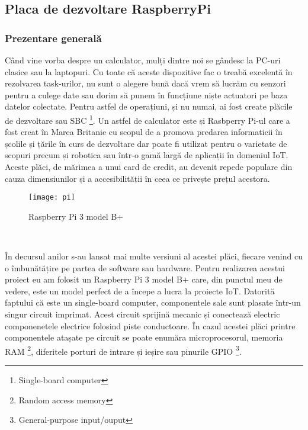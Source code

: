 \documentclass[../IoMusT.tex]{subfiles}
\begin{document}
\subsection{Placa de dezvoltare RaspberryPi}
\subsubsection{Prezentare generală}
Când vine vorba despre un calculator, mulți dintre noi se gândesc la PC-uri clasice sau la laptopuri. Cu toate că aceste dispozitive fac o treabă excelentă în rezolvarea task-urilor, nu sunt o alegere bună dacă vrem să lucrăm cu senzori pentru a culege date sau dorim să punem în funcțiune niște actuatori pe baza datelor colectate. Pentru astfel de operațiuni, și nu numai, ai fost create plăcile de dezvoltare sau SBC \footnote{Single-board computer}. Un astfel de calculator este și Rasbperry Pi-ul care a fost creat în Marea Britanie cu scopul de a promova predarea informaticii în școlile și țările în curs de dezvoltare \cite{SBC} dar poate fi utilizat pentru o varietate de scopuri precum și robotica sau într-o gamă largă de aplicații în domeniul IoT. Aceste plăci, de mărimea a unui card de credit, au devenit repede populare din cauza dimensiunilor și a accesibilității în ceea ce privește prețul acestora. 
\begin{figure}[h]
\centering
\texttt{[image: pi]}
\caption{Raspberry Pi 3 model B+}
\end{figure}
\\
\par În decursul anilor s-au lansat mai multe versiuni al acestei plăci, fiecare venind cu o îmbunătățire pe partea de software sau hardware. Pentru realizarea acestui proiect eu am folosit un Raspberry Pi 3 model B+ care, din punctul meu de vedere, este un model perfect de a începe a lucra la proiecte IoT. Datorită faptului că este un single-board computer, componentele sale sunt plasate într-un singur circuit imprimat. Acest circuit sprijină mecanic și conectează electric componenetele electrice folosind piste conductoare. În cazul acestei plăci printre componentele atașate pe circuit se poate enumăra microprocesorul, memoria RAM \footnote{Random access memory}, diferitele porturi de intrare și ieșire sau pinurile GPIO \footnote{General-purpose input/ouput}.
\\
\par
\end{document}
